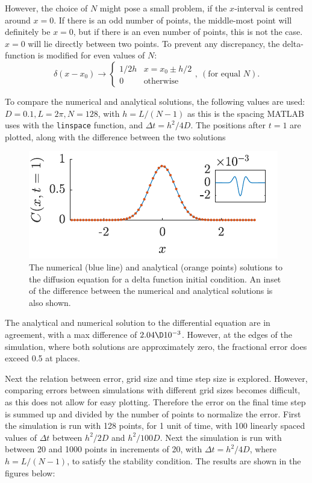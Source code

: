 \documentclass[a4paper,10pt]{article} 	%
\numberwithin{equation}{section}
\begin{document}
	However, the choice of $ N $ might pose a small problem, if the $ x $-interval is centred around $ x=0 $. If there is an odd number of points, the middle-most point will definitely be $ x=0 $, but if there is an even number of points, this is not the case. $ x= 0 $ will lie directly between two points. To prevent any discrepancy, the delta-function is modified for even values of $ N $:
	\begin{equation}\label{key}
	\delta(x-x_0) \to \begin{cases}
	1/2h & x=x_0\pm h/2 \\
	0 & \text{otherwise}
	\end{cases}, \ (\text{for equal } N).
	\end{equation}
	
	To compare the numerical and analytical solutions, the following values are used: $D = 0.1, L = 2\pi,N=128 $, with $ h=L/(N-1) $ as this is the spacing MATLAB uses with the \texttt{linspace} function, and $ \Delta t = h^2/4D $. The positions after $ t = 1 $ are plotted, along with the difference between the two solutions
	\begin{figure}[H]
		\centering
		\includegraphics[width = 0.5\linewidth]{diffSimple.pdf}
		\caption{The numerical (blue line) and analytical (orange points) solutions to the diffusion equation for a delta function initial condition. An inset of the difference between the numerical and analytical solutions is also shown.}
		\label{fig:diffSimple}
	\end{figure}
	The analytical and numerical solution to the differential equation are in agreement, with a max difference of $ 2.04\D10^{-3} $. However, at the edges of the simulation, where both solutions are approximately zero, the fractional error does exceed 0.5 at places.
	
	Next the relation between error, grid size and time step size is explored. However, comparing errors between simulations with different grid sizes becomes difficult, as this does not allow for easy plotting. Therefore the error on the final time step is summed up and divided by the number of points to normalize the error. First the simulation is run with 128 points, for 1 unit of time, with 100 linearly spaced values of $ \Delta t $ between $ h^2/2D $ and $ h^2/100D $. Next the simulation is run with between 20 and 1000 points in increments of 20, with $ \Delta t = h^2/4D $, where $ h = L/(N-1) $, to satisfy the stability condition. The results are shown in the figures below:
	 
\end{document}
